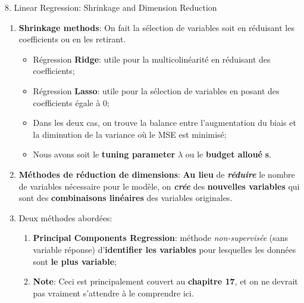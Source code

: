 \documentclass[12pt, titlepage, french]{report}
\begin{document}
\begin{CHPT_SUMM}[label = {VALID-SHRINKAGE}]{8. Linear Regression:  Shrinkage and Dimension Reduction}
\begin{enumerate}
	\item	\textbf{Shrinkage methods}: On fait la sélection de variables soit en réduisant les coefficients ou en les retirant.
	\begin{itemize}
		\item	Régression \textbf{Ridge}: utile pour la multicolinéarité en réduisant des coefficients;
		\item	Régression \textbf{Lasso}: utile pour la sélection de variables en posant des coefficients égale à 0;
		\item	Dans les deux cas, on trouve la balance entre l'augmentation du biais et la diminution de la variance où le MSE est minimisé;
		\item	Nous avons soit le \textbf{tuning parameter} $\lambda$ ou le \textbf{budget alloué} \textbf{s}.
	\end{itemize}
	\item	\textbf{Méthodes de réduction de dimensions}: \textbf{Au lieu} de \textit{\textbf{réduire}} le nombre de variables nécessaire pour le modèle, on \textbf{\textit{crée}} des \textbf{nouvelles variables} qui sont des \textbf{combinaisons linéaires} des variables originales.
	\item[]	Deux méthodes abordées: 
	\begin{enumerate}
		\item	\textbf{Principal Components Regression}: méthode \textit{non-supervisée} (sans variable réponse) d'\textbf{identifier les variables} pour lesquelles les données sont \textbf{le plus variable};
		\item[]	\textbf{Note}: Ceci est principalement couvert au \textbf{chapitre 17}, et on ne devrait pas vraiment s'attendre à le comprendre ici.
		\begin{itemize}

\end{itemize}
\end{enumerate}
\end{enumerate}
\end{CHPT_SUMM}
\end{document}
